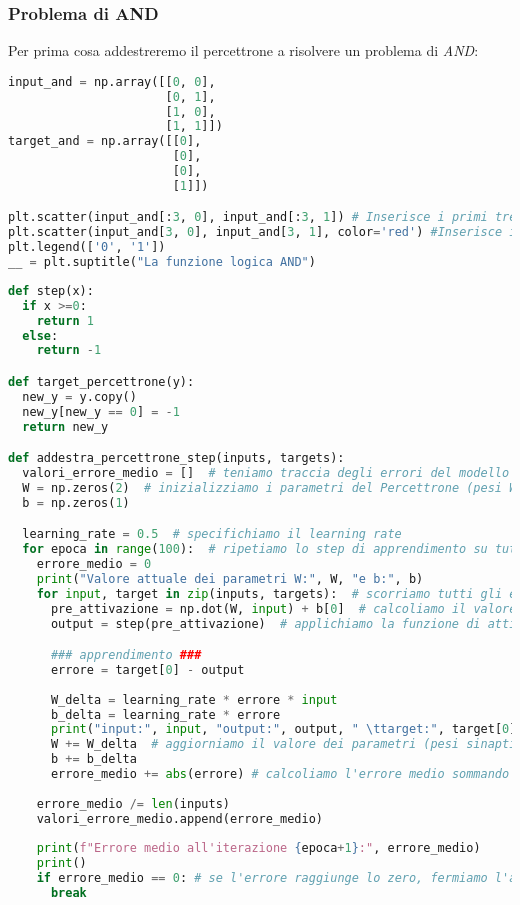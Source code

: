 \documentclass[12pt, a4paper]{article}
\begin{document}
\subsubsection{Problema di AND}
Per prima cosa addestreremo il percettrone a risolvere un problema di \textit{AND}:
\begin{lstlisting}[language=Python, caption=Inizializzazione]
input_and = np.array([[0, 0],
                      [0, 1],
                      [1, 0],
                      [1, 1]])
target_and = np.array([[0],
                       [0],
                       [0],
                       [1]])

plt.scatter(input_and[:3, 0], input_and[:3, 1]) # Inserisce i primi tre elementi degli array
plt.scatter(input_and[3, 0], input_and[3, 1], color='red') #Inserisce il quarto valore degli array
plt.legend(['0', '1'])
__ = plt.suptitle("La funzione logica AND")
\end{lstlisting}
\begin{lstlisting}[language=Python, caption=Funzioni di Addestramento]
def step(x):
  if x >=0:
    return 1
  else:
    return -1

def target_percettrone(y):
  new_y = y.copy()
  new_y[new_y == 0] = -1
  return new_y

def addestra_percettrone_step(inputs, targets):
  valori_errore_medio = []  # teniamo traccia degli errori del modello
  W = np.zeros(2)  # inizializziamo i parametri del Percettrone (pesi W e bias b) a zero
  b = np.zeros(1)

  learning_rate = 0.5  # specifichiamo il learning rate
  for epoca in range(100):  # ripetiamo lo step di apprendimento su tutti gli esempi per un massimo di 100 volte
    errore_medio = 0
    print("Valore attuale dei parametri W:", W, "e b:", b)
    for input, target in zip(inputs, targets):  # scorriamo tutti gli esempi
      pre_attivazione = np.dot(W, input) + b[0]  # calcoliamo il valore di pre-attivazione (somma pesata a cui sottraggo il bias)
      output = step(pre_attivazione)  # applichiamo la funzione di attivazione "a scalino" per calcolare l'output

      ### apprendimento ###
      errore = target[0] - output
      
      W_delta = learning_rate * errore * input
      b_delta = learning_rate * errore
      print("input:", input, "output:", output, " \ttarget:", target[0], " \terrore:", errore, " \tW_delta:", W_delta, " \tb_delta:", b_delta)
      W += W_delta  # aggiorniamo il valore dei parametri (pesi sinaptici e bias) del Percettrone
      b += b_delta
      errore_medio += abs(errore) # calcoliamo l'errore medio sommando i valori assoluti dell'errore
      
    errore_medio /= len(inputs)
    valori_errore_medio.append(errore_medio)
    
    print(f"Errore medio all'iterazione {epoca+1}:", errore_medio)
    print()
    if errore_medio == 0: # se l'errore raggiunge lo zero, fermiamo l'apprendimento
      break
\end{lstlisting}
\end{document}

